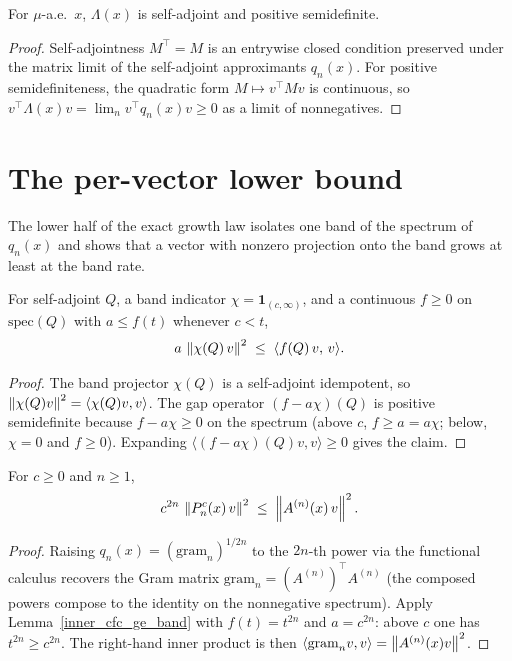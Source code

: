 \begin{proposition}\label{oseledetsLimit_posSemidef}
  \leanok
  For \(\mu\)-a.e.\ \(x\), \(\Lambda(x)\) is self-adjoint and positive semidefinite.
\end{proposition}
\begin{proof}\leanok
  Self-adjointness \(M^{\top}=M\) is an entrywise closed condition preserved under the matrix
  limit of the self-adjoint approximants \(q_n(x)\). For positive semidefiniteness, the quadratic
  form \(M\mapsto v^{\top}Mv\) is continuous, so
  \(v^{\top}\Lambda(x)v = \lim_n v^{\top} q_n(x) v \ge 0\) as a limit of nonnegatives.
\end{proof}

\section{The per-vector lower bound}

The lower half of the exact growth law isolates one band of the spectrum of \(q_n(x)\) and shows
that a vector with nonzero projection onto the band grows at least at the band rate.

\begin{lemma}\label{inner_cfc_ge_band}
  \leanok
  For self-adjoint \(Q\), a band indicator \(\chi=\mathbf 1_{(c,\infty)}\), and a continuous
  \(f\ge 0\) on \(\mathrm{spec}(Q)\) with \(a\le f(t)\) whenever \(c<t\),
  \[
    a\,\left\lVert \chi(Q)\,v \right\rVert^2 \;\le\; \langle f(Q)\,v,\,v\rangle .
  \]
\end{lemma}
\begin{proof}\leanok
  The band projector \(\chi(Q)\) is a self-adjoint idempotent, so
  \(\left\lVert \chi(Q)v \right\rVert^2 = \langle \chi(Q)v,v\rangle\). The gap operator
  \((f-a\chi)(Q)\) is positive semidefinite because \(f-a\chi\ge 0\) on the spectrum (above \(c\),
  \(f\ge a=a\chi\); below, \(\chi=0\) and \(f\ge0\)). Expanding
  \(\langle(f-a\chi)(Q)v,v\rangle\ge0\) gives the claim.
\end{proof}

\begin{lemma}\label{cocycle_apply_sq_ge_band}
  \leanok
  For \(c\ge0\) and \(n\ge1\),
  \[
    c^{2n}\,\left\lVert P^{c}_n(x)\,v \right\rVert^2 \;\le\; \left\lVert A^{(n)}(x)\,v \right\rVert^2 .
  \]
\end{lemma}
\begin{proof}\leanok
  Raising \(q_n(x)=(\mathrm{gram}_n)^{1/2n}\) to the \(2n\)-th power via the functional calculus
  recovers the Gram matrix \(\mathrm{gram}_n=(A^{(n)})^{\top}A^{(n)}\) (the composed powers compose
  to the identity on the nonnegative spectrum). Apply
  Lemma~\ref{inner_cfc_ge_band} with \(f(t)=t^{2n}\) and \(a=c^{2n}\): above \(c\) one has
  \(t^{2n}\ge c^{2n}\). The right-hand inner product is then
  \(\langle \mathrm{gram}_n v,v\rangle = \left\lVert A^{(n)}(x)v \right\rVert^2\).
\end{proof}

